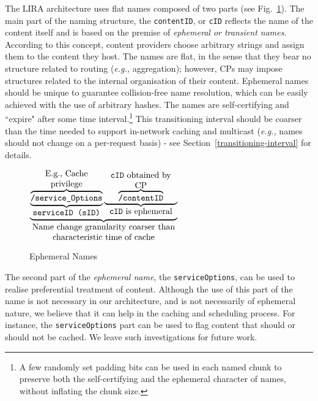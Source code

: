 \documentclass{sig-alternate}
\newcommand{\eg}{{\em e.g.,\/ }}
\begin{document}
The LIRA architecture uses flat names composed of two parts (see Fig.~\ref{ephemeral-names}). The main part of the naming structure, the \texttt{contentID}, or \texttt{cID} reflects the name of the content itself and is based on the premise of \textit{ephemeral or transient names}. According to this concept, content providers choose arbitrary strings and assign them to the content they host. The names are flat, in the sense that they bear no structure related to routing (\eg aggregation); however, CPs may impose structures related to the internal organisation of their content. Ephemeral names should be unique to guarantee collision-free name resolution, which can be easily achieved with the use of arbitrary hashes. The names are self-certifying and ``expire" after some time interval.\footnote{A few randomly set padding bits can be used in each named chunk to preserve both the self-certifying and the ephemeral character of names, without inflating the chunk size.}
This transitioning interval should be coarser than the time needed to support in-network caching and multicast (\eg names should not change on a per-request basis) - see Section~\ref{transitioning-interval} for details.



\begin{figure}[h!]
\begin{centering}
\small
$
\underbrace{\underbrace{ \overbrace{\hbox{\texttt{/service\_Options}}}^{\parbox{3cm}{\centering E.g., Cache privilege}}}_{\hbox{\texttt{serviceID (sID)}}} \underbrace{\overbrace{\hbox{\texttt{/contentID}}}^{\parbox{3cm}{\centering \texttt{cID} obtained by CP }}}_{\parbox{3cm}{\centering \texttt{cID} is ephemeral}}}_{\parbox{6cm}{\centering Name change granularity coarser than characteristic time of cache}}
$
\caption{Ephemeral Names}
\label{ephemeral-names}
\end{centering}
\end{figure}


\normalsize




The second part of the \textit{ephemeral name}, the \texttt{serviceOptions}, can be used to realise preferential treatment of content. Although the use of this part of the name is not necessary in our architecture, and is not necessarily of ephemeral nature, we believe that it can help in the caching and scheduling process. For instance, the \texttt{serviceOptions} part can be used to flag content that should or should not be cached. We leave such investigations for future work.
\end{document}
